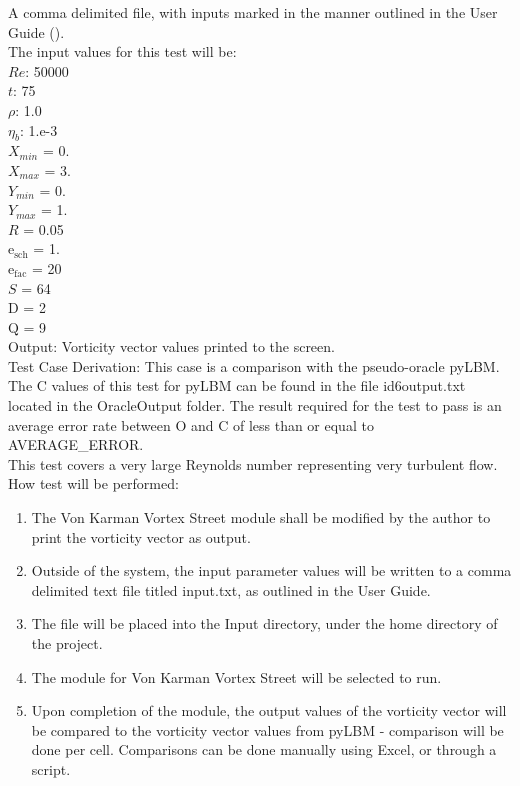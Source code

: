 \documentclass[12pt, titlepage]{article}
\begin{document}
\begin{enumerate}
A comma delimited file, with inputs marked in the manner outlined in the User Guide (\citet{LBM_UserGuide_PM}).\\The input values for this test will be:\\
$Re$: 50000\\
$t$: 75\\
$\rho$: 1.0\\
$\eta_b$: 1.e-3\\
$X_{min}$ = 0.\\
$X_{max}$ = 3.\\
$Y_{min}$ = 0.\\
$Y_{max}$ = 1.\\
$R$ = 0.05\\
$\mathrm{e_{sch}}$ = 1.\\
$\mathrm{e_{fac}}$ = 20\\
$S$ = 64\\
$\mathrm{D}$ = 2\\
$\mathrm{Q}$ = 9\\

Output: Vorticity vector values printed to the screen. \\

Test Case Derivation: This case is a comparison with the pseudo-oracle pyLBM. The C values of this test for pyLBM can be found in the file id6output.txt located in the OracleOutput folder. The result required for the test to pass is an average error rate between O and C of less than or equal to AVERAGE\_ERROR.\\
This test covers a very large Reynolds number representing very turbulent flow.\\	

					
How test will be performed: 

\begin{enumerate}
\item The Von Karman Vortex Street module shall be modified by the author to print the vorticity vector as output.
\item Outside of the system, the input parameter values will be written to a comma delimited text file titled input.txt, as outlined in the User Guide.
\item The file will be placed into the Input directory, under the home directory of the project.
\item The module for Von Karman Vortex Street will be selected to run.
\item Upon completion of the module, the output values of the vorticity vector will be compared to the vorticity vector values from pyLBM - comparison will be done per cell. Comparisons can be done manually using Excel, or through a script.\\
\end{enumerate}


\end{enumerate}
\end{document}
